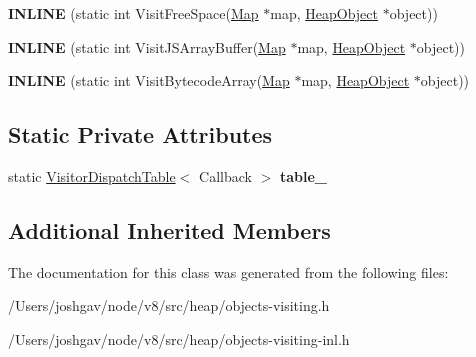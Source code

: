 \begin{DoxyCompactItemize}
\item 
{\bfseries I\+N\+L\+I\+NE} (static int Visit\+Free\+Space(\hyperlink{classv8_1_1internal_1_1_map}{Map} $\ast$map, \hyperlink{classv8_1_1internal_1_1_heap_object}{Heap\+Object} $\ast$object))\hypertarget{classv8_1_1internal_1_1_static_new_space_visitor_a3682ae947d5738ab2a7e9414c0f90ecb}{}\label{classv8_1_1internal_1_1_static_new_space_visitor_a3682ae947d5738ab2a7e9414c0f90ecb}

\item 
{\bfseries I\+N\+L\+I\+NE} (static int Visit\+J\+S\+Array\+Buffer(\hyperlink{classv8_1_1internal_1_1_map}{Map} $\ast$map, \hyperlink{classv8_1_1internal_1_1_heap_object}{Heap\+Object} $\ast$object))\hypertarget{classv8_1_1internal_1_1_static_new_space_visitor_a62cb94a5120a04d239e05d94ee70a050}{}\label{classv8_1_1internal_1_1_static_new_space_visitor_a62cb94a5120a04d239e05d94ee70a050}

\item 
{\bfseries I\+N\+L\+I\+NE} (static int Visit\+Bytecode\+Array(\hyperlink{classv8_1_1internal_1_1_map}{Map} $\ast$map, \hyperlink{classv8_1_1internal_1_1_heap_object}{Heap\+Object} $\ast$object))\hypertarget{classv8_1_1internal_1_1_static_new_space_visitor_a2845eb6ba99f20634f3858e93f6744ba}{}\label{classv8_1_1internal_1_1_static_new_space_visitor_a2845eb6ba99f20634f3858e93f6744ba}

\end{DoxyCompactItemize}
\subsection*{Static Private Attributes}
\begin{DoxyCompactItemize}
\item 
static \hyperlink{classv8_1_1internal_1_1_visitor_dispatch_table}{Visitor\+Dispatch\+Table}$<$ Callback $>$ {\bfseries table\+\_\+}\hypertarget{classv8_1_1internal_1_1_static_new_space_visitor_af17732a26562753f2735430fce0831bc}{}\label{classv8_1_1internal_1_1_static_new_space_visitor_af17732a26562753f2735430fce0831bc}

\end{DoxyCompactItemize}
\subsection*{Additional Inherited Members}


The documentation for this class was generated from the following files\+:\begin{DoxyCompactItemize}
\item 
/\+Users/joshgav/node/v8/src/heap/objects-\/visiting.\+h\item 
/\+Users/joshgav/node/v8/src/heap/objects-\/visiting-\/inl.\+h\end{DoxyCompactItemize}
